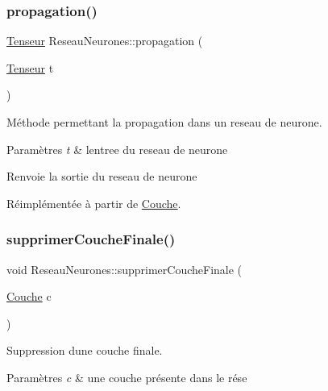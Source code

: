 \subsubsection{\texorpdfstring{propagation()}{propagation()}}
{\footnotesize\ttfamily \hyperlink{classTenseur}{Tenseur} Reseau\+Neurones\+::propagation (\begin{DoxyParamCaption}\item[{\hyperlink{classTenseur}{Tenseur}}]{t }\end{DoxyParamCaption})\hspace{0.3cm}{\ttfamily [virtual]}}



Méthode permettant la propagation dans un reseau de neurone. 


\begin{DoxyParams}{Paramètres}
{\em t} & l\textquotesingle{}entree du reseau de neurone \\
\hline
\end{DoxyParams}
\begin{DoxyReturn}{Renvoie}
la sortie du reseau de neurone 
\end{DoxyReturn}


Réimplémentée à partir de \hyperlink{classCouche_a1f0ed59e21020f5d4f37933af4d1b1e5}{Couche}.

\mbox{\label{classReseauNeurones_a1451816837d4df8ad486775cc2f9730b}} 
\subsubsection{\texorpdfstring{supprimer\+Couche\+Finale()}{supprimerCoucheFinale()}}
{\footnotesize\ttfamily void Reseau\+Neurones\+::supprimer\+Couche\+Finale (\begin{DoxyParamCaption}\item[{\hyperlink{classCouche}{Couche}}]{c }\end{DoxyParamCaption})}



Suppression d\textquotesingle{}une couche finale. 


\begin{DoxyParams}{Paramètres}
{\em c} & une couche présente dans le rése \\
\hline
\end{DoxyParams}
\mbox{\label{classReseauNeurones_a1f8002e2367febe871dda7dc32c02784}} 
